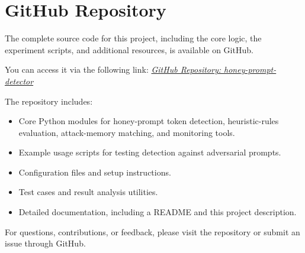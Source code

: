 \documentclass[manuscript,screen,review]{acmart}
\begin{document}
\section{GitHub Repository}
\label{appendix:a}

The complete source code for this project, including the core logic, the experiment scripts, and additional resources, is available on GitHub.

\noindent
You can access it via the following link:
\href{https://github.com/Yaima/honey-prompt-detector}{\textit{GitHub Repository: honey-prompt-detector}}

\noindent
The repository includes:
\begin{itemize}
    \item Core Python modules for honey-prompt token detection, heuristic-rules evaluation, attack-memory matching, and monitoring tools.
    \item Example usage scripts for testing detection against adversarial prompts.
    \item Configuration files and setup instructions.
    \item Test cases and result analysis utilities.
    \item Detailed documentation, including a README and this project description.
\end{itemize}

\noindent
For questions, contributions, or feedback, please visit the repository or submit an issue through GitHub.
\end{document}
